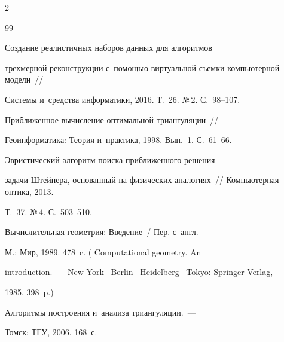\begin{multicols}{2}
\begin{enumerate}[1.]
  \end{enumerate}


  


{\small\frenchspacing


 {%




 \begin{thebibliography}{99}




 Создание реалистичных наборов данных для алгоритмов 


трехмерной реконструкции с~по\-мощью виртуальной съем\-ки компьютерной модели~// 


Системы и~средства информатики, 2016. Т.~26. №\,2. С.~98--107.







 При\-бли\-жен\-ное вы\-чис\-ле\-ние оптимальной триангуляции~// 


Геоинформатика: Теория и~практика, 1998. Вып.~1. С.~61--66.







 Эвристический алгоритм поиска при\-бли\-жен\-но\-го решения 


задачи Штейнера, основанный на физических аналогиях~// Компьютерная оптика, 2013. 


Т.~37. №\,4. С.~503--510.







 Вы\-чис\-ли\-тель\-ная гео\-мет\-рия: Введение~/ Пер. с~англ.~--- 


М.: Мир, 1989. 478~c. ( Computational geometry. An 


introduction.~--- New York\,--\,Berlin\,--\,Heidelberg\,--\,Tokyo: Springer-Verlag, 


1985. 398~p.)




 Алгоритмы по\-стро\-ения и~анализа триангуляции.~--- 


Томск: ТГУ, 2006. 168~с.



\end{thebibliography}}}
\end{multicols}

